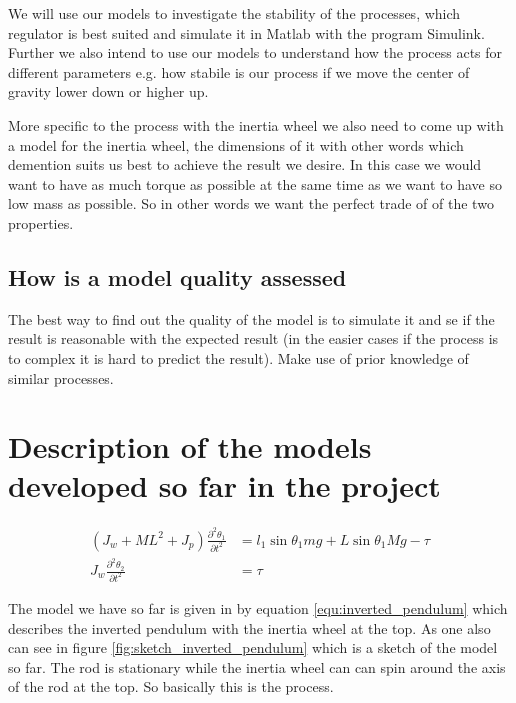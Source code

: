 \documentclass{article}
\begin{document}
We will use our models to investigate the stability of the processes, which regulator is best suited and simulate it in Matlab with the program Simulink. Further we also intend to use our models to understand how the process acts for different parameters e.g. how stabile is our process if we move the center of gravity lower down or higher up.

More specific to the process with the inertia wheel we also need to come up with a model for the inertia wheel, the dimensions of it with other words which demention suits us best to achieve the result we desire. In this case we would want to have as much torque as possible at the same time as we want to have so low mass as possible. So in other words we want the perfect trade of of the two properties. 


\subsection{How is a model quality assessed}

The best way to find out the quality of the model is to simulate it and se if the result is reasonable with the expected result (in the easier cases if the process is to complex it is hard to predict the result). Make use of prior knowledge of similar processes.    


\section{Description of the models developed so far in the project }

\begin{equation}
		\begin{aligned}
	     	 (J_{w}+ML^2 + J_{p} ) \frac{\partial^2 \theta_{1} }{\partial t^2}  &= l_{1} \sin{\theta_{1}} m g + L \sin{\theta_{1}} M g - \tau    \\  
		 J_{w} \frac{\partial^2 \theta_{2}} {\partial t^2} &= \tau
		\end{aligned}
	 	\label{equ:inverted_pendulum}  
\end{equation}


The model we have so far is given in by equation \ref{equ:inverted_pendulum} which describes the inverted pendulum with the inertia wheel at the top. As one also can see in figure \ref{fig:sketch_inverted_pendulum} which is a sketch of the model so far. The rod is stationary while the inertia wheel can can spin around the axis of the rod at the top. So basically this is the process.
\end{document}
